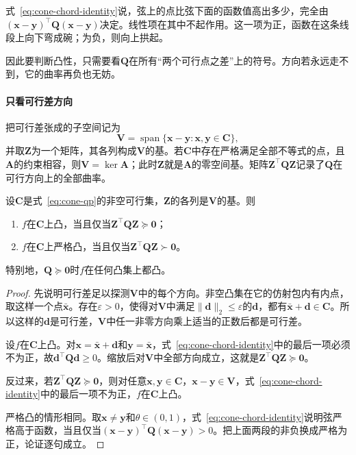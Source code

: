 式~\eqref{eq:cone-chord-identity}说，弦上的点比弦下面的函数值高出多少，完全由$(\bm{x}-\bm{y})^\top\bm{Q}(\bm{x}-\bm{y})$决定。线性项在其中不起作用。这一项为正，函数在这条线段上向下弯成碗；为负，则向上拱起。

因此要判断凸性，只需要看$\bm{Q}$在所有“两个可行点之差”上的符号。方向若永远走不到，它的曲率再负也无妨。

\paragraph{只看可行差方向}
把可行差张成的子空间记为
\begin{equation}
 \bm{V}=\operatorname{span}\{\bm{x}-\bm{y}:\bm{x},\bm{y}\in\bm{C}\},
 \label{eq:cone-feasible-subspace}
\end{equation}
并取$\bm{Z}$为一个矩阵，其各列构成$\bm{V}$的基。若$\bm{C}$中存在严格满足全部不等式的点，且$\bm{A}$的约束相容，则$\bm{V}=\ker\bm{A}$；此时$\bm{Z}$就是$\bm{A}$的零空间基。矩阵$\bm{Z}^\top\bm{Q}\bm{Z}$记录了$\bm{Q}$在可行方向上的全部曲率。

\begin{theorem}[可行集上的凸性]
\label{thm:cone-feasible-convexity}
设$\bm{C}$是式~\eqref{eq:cone-qp}的非空可行集，$\bm{Z}$的各列是$\bm{V}$的基。则
\begin{enumerate}
 \item $f$在$\bm{C}$上凸，当且仅当$\bm{Z}^\top\bm{Q}\bm{Z}\succeq\bm{0}$；
 \item $f$在$\bm{C}$上严格凸，当且仅当$\bm{Z}^\top\bm{Q}\bm{Z}\succ\bm{0}$。
\end{enumerate}
特别地，$\bm{Q}\succeq\bm{0}$时$f$在任何凸集上都凸。
\end{theorem}

\begin{proof}
先说明可行差足以探测$\bm{V}$中的每个方向。非空凸集在它的仿射包内有内点，取这样一个点$\bar{\bm{x}}$。存在$\varepsilon>0$，使得对$\bm{V}$中满足$\lVert\bm{d}\rVert_2\leq\varepsilon$的$\bm{d}$，都有$\bar{\bm{x}}+\bm{d}\in\bm{C}$。所以这样的$\bm{d}$是可行差，$\bm{V}$中任一非零方向乘上适当的正数后都是可行差。

设$f$在$\bm{C}$上凸。对$\bm{x}=\bar{\bm{x}}+\bm{d}$和$\bm{y}=\bar{\bm{x}}$，式~\eqref{eq:cone-chord-identity}中的最后一项必须不为正，故$\bm{d}^\top\bm{Q}\bm{d}\geq0$。缩放后对$\bm{V}$中全部方向成立，这就是$\bm{Z}^\top\bm{Q}\bm{Z}\succeq\bm{0}$。

反过来，若$\bm{Z}^\top\bm{Q}\bm{Z}\succeq\bm{0}$，则对任意$\bm{x},\bm{y}\in\bm{C}$，$\bm{x}-\bm{y}\in\bm{V}$，式~\eqref{eq:cone-chord-identity}中的最后一项不为正，$f$在$\bm{C}$上凸。

严格凸的情形相同。取$\bm{x}\neq\bm{y}$和$\theta\in(0,1)$，式~\eqref{eq:cone-chord-identity}说明弦严格高于函数，当且仅当$(\bm{x}-\bm{y})^\top\bm{Q}(\bm{x}-\bm{y})>0$。把上面两段的非负换成严格为正，论证逐句成立。
\end{proof}

